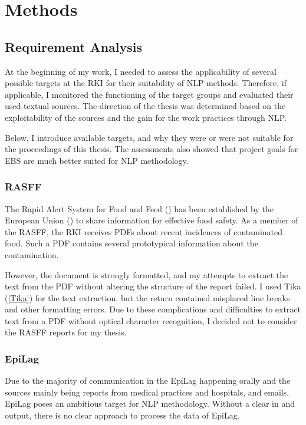 \chapter{Methods}

\section{Requirement Analysis}
At the beginning of my work, I needed to assess the applicability of several possible targets at the RKI for their suitability of NLP methods.
Therefore, if applicable, I monitored the functioning of the target groups and evaluated their used textual sources.
The direction of the thesis was determined based on the exploitability of the sources and the gain for the work practices through NLP.

Below, I introduce available targets, and why they were or were not suitable for the proceedings of this thesis. The assessments also showed that project goals for EBS are much better suited for NLP methodology.

\subsection{RASFF}
The Rapid Alert System for Food and Feed () has been established by the European Union () to share information for effective food safety. As a member of the RASFF, the RKI receives PDFs about recent incidences of contaminated food. Such a PDF contains several prototypical information about the contamination.

However, the document is strongly formatted, and my attempts to extract the text from the PDF without altering the structure of the report failed. I used Tika (\ref{Tika}) for the text extraction, but the return contained misplaced line breaks and other formatting errors. Due to these complications and difficulties to extract text from a PDF without optical character recognition, I decided not to consider the RASFF reports for my thesis.

\subsection{EpiLag}
Due to the majority of communication in the EpiLag happening orally and the sources mainly being reports from medical practices and hospitals, and emails, EpiLag poses an ambitious target for NLP methodology.
Without a clear in and output, there is no clear approach to process the data of EpiLag.

